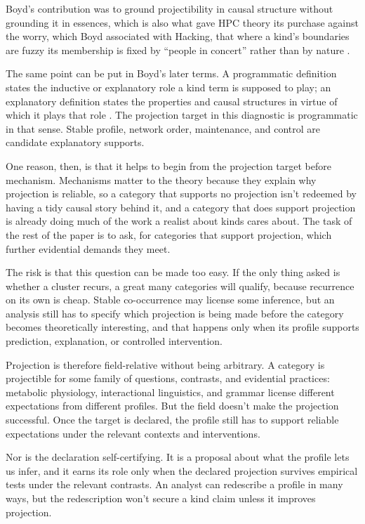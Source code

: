 \documentclass[12pt]{article}
\begin{document}
Boyd's contribution was to ground projectibility in causal structure without
grounding it in essences, which is also what gave HPC theory its purchase against
the worry, which Boyd associated with Hacking, that where a kind's boundaries are
fuzzy its membership is fixed by \enquote{people in concert} rather than by nature
\citep{boyd1991}.

The same point can be put in Boyd's later terms. A programmatic definition states
the inductive or explanatory role a kind term is supposed to play; an explanatory
definition states the properties and causal structures in virtue of which it plays
that role \citep{boyd1999}. The projection target in this diagnostic is
programmatic in that sense. Stable profile, network order, maintenance, and
control are candidate explanatory supports.

One reason, then, is that it helps to begin from the projection target before
mechanism. Mechanisms matter to the theory because they explain why projection is
reliable, so a category that supports no projection isn't redeemed by having a
tidy causal story behind it, and a category that does support projection is
already doing much of the work a realist about kinds cares about. The task of the
rest of the paper is to ask, for categories that support projection, which
further evidential demands they meet.

The risk is that this question can be made too easy. If the only thing asked is
whether a cluster recurs, a great many categories will qualify, because recurrence
on its own is cheap. Stable co-occurrence may license some inference, but an
analysis still has to specify which projection is being made before the
category becomes theoretically interesting, and that happens only when its profile
supports prediction, explanation, or controlled intervention.

Projection is therefore field-relative without being arbitrary. A category is
projectible for some family of questions, contrasts, and evidential practices:
metabolic physiology, interactional linguistics, and grammar license different
expectations from different profiles. But the field doesn't make the projection
successful. Once the target is declared, the profile still has to support reliable
expectations under the relevant contexts and interventions.

Nor is the declaration self-certifying. It is a proposal about what the profile
lets us infer, and it earns its role only when the declared projection survives
empirical tests under the relevant contrasts. An analyst can redescribe a profile
in many ways, but the redescription won't secure a kind claim unless it improves
projection.
\end{document}
